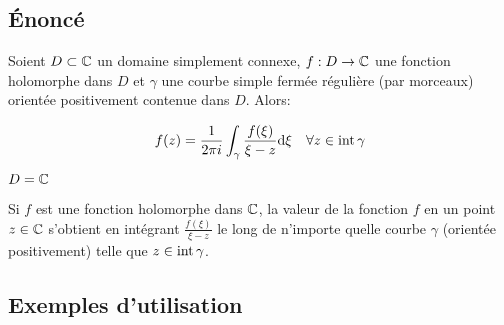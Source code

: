 \subsection{Énoncé}

\begin{theorem}[10.2, p.73]
    Soient $D \subset \mathbb{C}$ un domaine simplement connexe, $f: D \rightarrow \mathbb{C}$ une fonction holomorphe dans $D$ et $\gamma$ une courbe simple fermée régulière (par morceaux) orientée positivement contenue dans $D$.
    Alors:
    
    \[
    f(z) = \frac{1}{2 \pi i} \int_\gamma \frac{f(\xi)}{\xi - z} \mathrm{d}\xi \quad \forall z \in \textrm{int}\, \gamma
    \]
\end{theorem}

\begin{illustration}
    $D = \mathbb{C}$
    
    Si $f$ est une fonction holomorphe dans $\mathbb{C}$, la valeur de la fonction $f$ en un point $z \in \mathbb{C}$ s'obtient en intégrant $\frac{f(\xi)}{\xi - z}$ le long de n'importe quelle courbe $\gamma$ (orientée positivement) telle que $z \in \textrm{int}\, \gamma$.
\end{illustration}

\subsection{Exemples d'utilisation}

